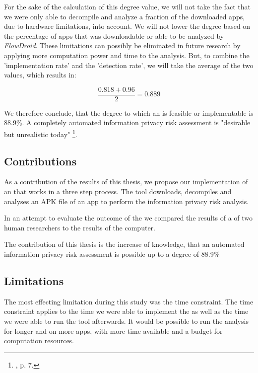 For the sake of the calculation of this degree value, we will not take the fact that we were only able to decompile and analyze a fraction of the downloaded apps, due to hardware limitations, into account.
We will not lower the degree based on the percentage of apps that was downloadable or able to be analyzed by \textit{FlowDroid}.
These limitations can possibly be eliminated in future research by applying more computation power and time to the analysis.
But, to combine the 'implementation rate' and the 'detection rate', we will take the average of the two values, which results in:

\begin{equation}
	\frac{0.818 + 0.96}{2} = 0.889
\end{equation}

We therefore conclude, that the degree to which an \aiprat is feasible or implementable is 88.9\%.
A completely automated information privacy risk assessment is "desirable but unrealistic today" \footnote{\cite{Knorr2015}, p. 7.}.

\subsection{Contributions}

As a contribution of the results of this thesis, we propose our implementation of an \aiprat that works in a three step process.
The tool downloads, decompiles and analyses an APK file of an app to perform the information privacy risk analysis.

In an attempt to evaluate the outcome of the \aiprat we compared the results of a \sca of two human researchers to the results of the computer.

The contribution of this thesis is the increase of knowledge, that an automated information privacy risk assessment is possible up to a degree of 88.9\%

\subsection{Limitations}\label{chapter:Limitations}

The most effecting limitation during this study was the time constraint.
The time constraint applies to the time we were able to implement the \aiprat as well as the time we were able to run the tool afterwards.
It would be possible to run the analysis for longer and on more apps, with more time available and a budget for computation resources.

